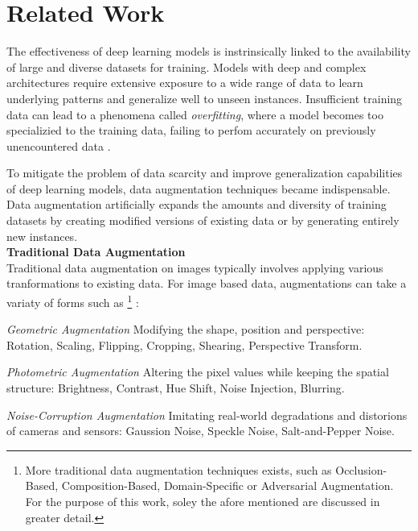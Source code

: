 \section{Related Work}\label{related_work}


The effectiveness of deep learning models is instrinsically linked to the availability of large and diverse datasets for training. Models with deep and complex architectures require extensive exposure to a wide range of data to learn underlying patterns and generalize well to unseen instances. Insufficient training data can lead to a phenomena called \textit{overfitting}, where a model becomes too specializied to the training data, failing to perfom accurately on previously unencountered data \cite{Ying2019overfittinganditssolutions}.

To mitigate the problem of data scarcity and improve generalization capabilities of deep learning models, data augmentation techniques became indispensable. Data augmentation artificially expands the amounts and diversity of training datasets by creating modified versions of existing data or by generating entirely new instances. \\

\noindent\textbf{Traditional Data Augmentation}\label{traditional_data_augmentation} \\
Traditional data augmentation on images typically involves applying various tranformations to existing data. For image based data, augmentations can take a variaty of forms such as
\footnote{More traditional data augmentation techniques exists, such as Occlusion-Based, Composition-Based, Domain-Specific or Adversarial Augmentation. For the purpose of this work,  soley the afore mentioned are discussed in greater detail.}
:

\textit{Geometric Augmentation}
Modifying the shape, position and perspective: Rotation, Scaling, Flipping, Cropping, Shearing, Perspective Transform.

\textit{Photometric Augmentation}
Altering the pixel values while keeping the spatial structure: Brightness, Contrast, Hue Shift, Noise Injection, Blurring.

\textit{Noise-Corruption Augmentation}
Imitating real-world degradations and distorions of cameras and sensors: Gaussion Noise, Speckle Noise, Salt-and-Pepper Noise.

